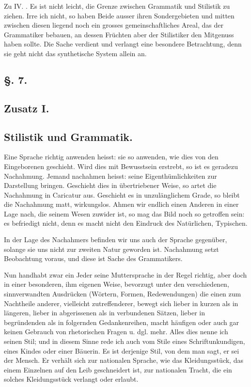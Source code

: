 Zu IV. . Es ist nicht leicht, die Grenze zwischen Grammatik und Stilistik zu ziehen. Irre ich nicht, so haben Beide ausser ihren Sondergebieten und mitten zwischen diesen liegend noch ein grosses gemeinschaftliches Areal, das der Grammatiker bebauen, an dessen Früchten aber der Stilistiker den Mitgenuss haben sollte. Die Sache verdient und verlangt eine besondere Betrachtung, denn sie geht nicht das synthetische System allein an.

\subsection*{§. 7.}\label{II.VI.7}
\subsection*{Zusatz I.}
\subsection*{Stilistik und Grammatik.}

Eine Sprache richtig anwenden heisst: sie so anwenden, wie dies von den Eingeborenen geschieht. Wird dies mit Bewusstsein erstrebt, so ist es geradezu Nachahmung. Jemand nachahmen heisst: seine Eigen\label{fp.109}thümlichkeiten zur Darstellung bringen. Geschieht dies in übertriebener Weise, so artet die Nachahmung in Caricatur aus. Geschieht es in unzulänglichem Grade, so bleibt die Nachahmung matt, wirkungslos. Ahmen wir endlich einen Anderen in einer Lage nach, die seinem Wesen zuwider ist, so mag das Bild noch so getroffen sein: es befriedigt nicht, denn es macht nicht den Eindruck des Natürlichen, Typischen.

In der Lage des Nachahmers befinden wir uns auch der Sprache gegenüber, solange sie uns nicht zur zweiten Natur geworden ist. Nachahmung setzt Beobachtung voraus, und diese ist Sache des Grammatikers.

Nun handhabt zwar ein Jeder seine Muttersprache in der Regel richtig, aber doch in einer besonderen, ihm eigenen Weise, bevorzugt unter den ver\-\label{sp.105}schie\-denen, sinnverwandten Ausdrücken (Wörtern, Formen, Redewendungen) die einen zum Nachtheile anderer, vielleicht zutreffenderer, bewegt sich lieber in kurzen als in längeren, lieber in abgerissenen als in verbundenen Sätzen, lieber in begründenden als in folgernden Gedankenreihen, macht häufigen oder auch gar keinen Gebrauch von rhetorischen Fragen u. dgl. mehr. Alles dies nenne ich seinen Stil; und in diesem Sinne rede ich auch vom Stile eines Schriftunkundigen, eines Kindes oder einer Bäuerin. Es ist derjenige Stil, von dem man sagt, er sei der Mensch. Er verhält sich zur nationalen Sprache, wie das Kleidungsstück, das einem Einzelnen auf den Leib geschneidert ist, zur nationalen Tracht, die ein solches Kleidungsstück verlangt oder erlaubt.

